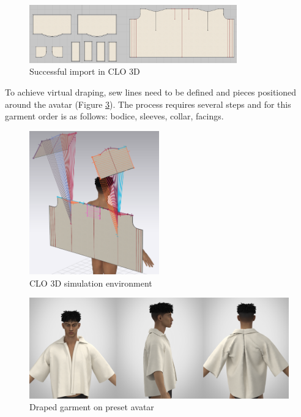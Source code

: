 \begin{figure} [H]
    \centering
    \includegraphics[width = 0.8\textwidth]{Images/suc import.png}
    \caption{Successful import in CLO 3D}
    \label{fig:successful import}
\end{figure}

To achieve virtual draping, sew lines need to be defined and pieces positioned around the avatar (Figure \ref{fig:render}). The process requires several steps and for this garment order is as follows: bodice, sleeves, collar, facings.

\begin{figure} [H]
    \centering
    \includegraphics[width = 0.5\textwidth]{Images/sew in CLO.png}
    \caption{CLO 3D simulation environment}
    \label{fig:sew in CLO}
\end{figure}

\begin{figure} [H]
    \centering
    \includegraphics[width = \textwidth]{Images/first render.PNG}
    \caption{Draped garment on preset avatar}
    \label{fig:render}
\end{figure}

